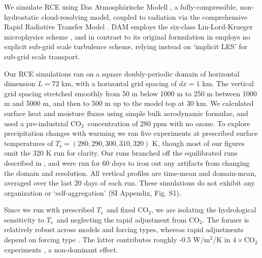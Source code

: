 \documentclass[9pt,twocolumn,twoside,lineno]{pnas-new}
\newcommand{\cotwo}{\ensuremath{\mathrm{CO_2}}}
\newcommand{\Wmsq}{\ensuremath{\mathrm{W/m^2}}}
\newcommand{\Ts}{\ensuremath{T_\mathrm{s}}}
\begin{document}
We simulate RCE using Das Atmosph\"arische Modell \cite[DAM,][]{romps2008}, a fully-compressible, non-hydrostatic cloud-resolving model, coupled to radiation via the comprehensive Rapid Radiative Transfer Model 
\cite[RRTM,][]{mlawer1997}. DAM employs the six-class Lin-Lord-Krueger  microphysics scheme \cite{lin1983, lord1984, krueger1995}, and in contrast to its original formulation in \cite{romps2008} employs no explicit sub-grid scale turbulence scheme, relying instead on `implicit LES'  \citep[][essentially just the existing numerical diffusion]{margolin2006}  for sub-grid scale transport.

	Our RCE simulations ran on a square doubly-periodic domain of horizontal dimension $L=72$ km, with  a horizontal grid spacing of $dx=1$ km. The vertical grid spacing stretched smoothly from 50 m  below 1000 m to 250 m  between 1000 m and 5000 m, and then to 500 m up to the model top at  30 km. We calculated surface heat and moisture fluxes using simple bulk aerodynamic formulae, and used a pre-industrial \cotwo\  concentration of 280 ppm with no ozone. To explore precipitation changes  with warming we ran five experiments at prescribed surface temperatures of $\Ts=(280,290,300,310,320)$ K, though most of our figures omit the 320 K run for clarity. Our runs branched off the equilibrated runs described in \cite{romps2014}, and were run for 60 days  to iron out any artifacts from changing the domain and resolution. All vertical profiles are time-mean and domain-mean, averaged over the last 20 days of each run. These simulations do not exhibit any organization or `self-aggregation' \citep{wing2017} (SI Appendix, Fig. S1).
	
Since we run with prescribed \Ts\ and fixed \cotwo, we are isolating the hydrological sensitivity to \Ts\ and neglecting the rapid adjustment from \cotwo. The former is relatively robust across models and forcing types, whereas rapid adjustments  depend on  forcing type \cite{flaschner2016,samset2017}. The latter contributes roughly -0.5 \Wmsq/K in $4\times \cotwo$ experiments \cite{flaschner2016}, a non-dominant effect. 

\end{document}
